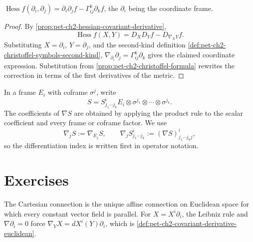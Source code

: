\begin{proposition}
  \label{prop:pet-ch2-hessian-coordinate-formula}
  \leanok
  $\operatorname{Hess}f(\partial_i,\partial_j)=\partial_i\partial_jf-\Gamma^k_{ij}\partial_kf$,
  the $\partial_i$ being the coordinate frame.
\end{proposition}
\begin{proof}
  \leanok
  \sketch
  By
  \cref{prop:pet-ch2-hessian-covariant-derivative},
  \[
    \operatorname{Hess}f(X,Y)
      =D_XD_Yf-D_{\nabla_XY}f.
  \]
  Substituting $X=\partial_i$, $Y=\partial_j$, and the second-kind definition
  \cref{def:pet-ch2-christoffel-symbols-second-kind},
  $\nabla_{\partial_i}\partial_j=\Gamma^k_{ij}\partial_k$ gives the claimed
  coordinate expression. Substitution from
  \cref{prop:pet-ch2-christoffel-formula} rewrites the correction in terms of
  the first derivatives of the metric.
\end{proof}

\begin{definition}
  \label{def:pet-ch2-covariant-derivative-index-notation}
  \leanok
  In a frame $E_i$
  with coframe $\sigma^j$, write
  \[
    S=S^i_{j_1\cdots j_k}
      E_i\otimes\sigma^{j_1}\otimes\cdots\otimes\sigma^{j_k}.
  \]
  The coefficients of $\nabla S$ are obtained by applying the product rule to
  the scalar coefficient and every frame or coframe factor. We use
  \[
    \nabla_jS:=\nabla_{E_j}S,\qquad
    \nabla_jS^i_{j_1\cdots j_k}
      :=(\nabla S)^i_{j_1\cdots j_kj},
  \]
  so the differentiation index is written first in operator notation.
\end{definition}

\section{Exercises}

\begin{remark}
  \label{rem:pet-ch2-ex-1}
  \leanok
  The Cartesian connection is the unique affine
  connection on Euclidean space for which every constant vector field is
  parallel.
  \sketch
  For $X=X^i\partial_i$, the Leibniz rule and
  $\nabla\partial_i=0$ force
  $\nabla_YX=dX^i(Y)\partial_i$, which is
  \cref{def:pet-ch2-covariant-derivative-euclidean}.
\end{remark}

